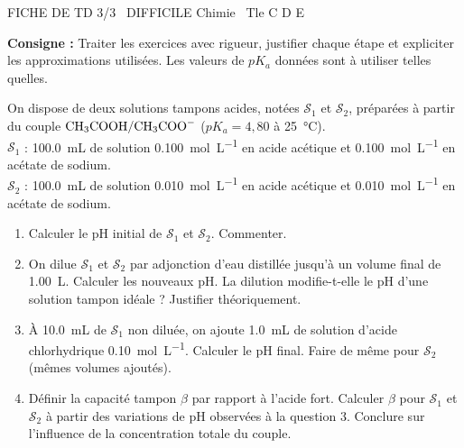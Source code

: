 \documentclass[11pt]{article}
\begin{document}
\begin{tcolorbox}[enhanced,colback=popink,colframe=popink,arc=10pt,boxrule=0pt,left=12pt,right=12pt,top=9pt,bottom=9pt]
{\color{white}\popxbold\small FICHE DE TD 3/3 \textbullet\ DIFFICILE \hfill Chimie \textbullet\ Tle C D E\par}
\end{tcolorbox}
\vspace{4pt}
\noindent \textbf{Consigne :} Traiter les exercices avec rigueur, justifier chaque étape et expliciter les approximations utilisées. Les valeurs de $pK_a$ données sont à utiliser telles quelles.

\begin{exercice}
On dispose de deux solutions tampons acides, notées $\mathcal{S}_1$ et $\mathcal{S}_2$, préparées à partir du couple $\ce{CH3COOH}/\ce{CH3COO-}$ ($pK_a = 4,80$ à \SI{25}{\celsius}).\\
$\mathcal{S}_1$ : \SI{100,0}{\milli\liter} de solution \SI{0,100}{\mol\per\liter} en acide acétique et \SI{0,100}{\mol\per\liter} en acétate de sodium.\\
$\mathcal{S}_2$ : \SI{100,0}{\milli\liter} de solution \SI{0,010}{\mol\per\liter} en acide acétique et \SI{0,010}{\mol\per\liter} en acétate de sodium.
\begin{enumerate}
    \item Calculer le pH initial de $\mathcal{S}_1$ et $\mathcal{S}_2$. Commenter.
    \item On dilue $\mathcal{S}_1$ et $\mathcal{S}_2$ par adjonction d'eau distillée jusqu'à un volume final de \SI{1,00}{\liter}. Calculer les nouveaux pH. La dilution modifie-t-elle le pH d'une solution tampon idéale ? Justifier théoriquement.
    \item À \SI{10,0}{\milli\liter} de $\mathcal{S}_1$ non diluée, on ajoute \SI{1,0}{\milli\liter} de solution d'acide chlorhydrique \SI{0,10}{\mol\per\liter}. Calculer le pH final. Faire de même pour $\mathcal{S}_2$ (mêmes volumes ajoutés).
    \item Définir la capacité tampon $\beta$ par rapport à l'acide fort. Calculer $\beta$ pour $\mathcal{S}_1$ et $\mathcal{S}_2$ à partir des variations de pH observées à la question 3. Conclure sur l'influence de la concentration totale du couple.
\end{enumerate}
\end{exercice}
\end{document}

